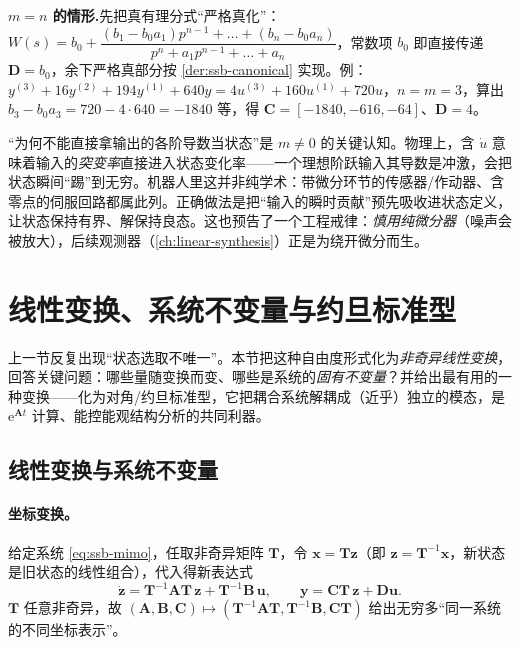 \begin{note}
\textbf{$m=n$ 的情形.}\;先把真有理分式“严格真化”：$W(s)=b_0+\dfrac{(b_1-b_0a_1)p^{n-1}+\dots+(b_n-b_0 a_n)}{p^n+a_1 p^{n-1}+\dots+a_n}$，常数项 $b_0$ 即直接传递 $\mathbf{D}=b_0$，余下严格真部分按 \cref{der:ssb-canonical} 实现。例：$y^{(3)}+16y^{(2)}+194y^{(1)}+640y=4u^{(3)}+160u^{(1)}+720u$，$n=m=3$，算出 $b_3-b_0a_3=720-4\cdot640=-1840$ 等，得 $\mathbf{C}=[-1840,-616,-64]$、$\mathbf{D}=4$\cite{zhang2017modern}。
\end{note}

\begin{insight}
“为何不能直接拿输出的各阶导数当状态”是 $m\neq0$ 的关键认知\cite{zhang2017modern}。物理上，含 $\dot u$ 意味着输入的\emph{突变率}直接进入状态变化率——一个理想阶跃输入其导数是冲激，会把状态瞬间“踢”到无穷。机器人里这并非纯学术：带微分环节的传感器/作动器、含零点的伺服回路都属此列。正确做法是把“输入的瞬时贡献”预先吸收进状态定义，让状态保持有界、解保持良态。这也预告了一个工程戒律：\emph{慎用纯微分器}（噪声会被放大），后续观测器（\cref{ch:linear-synthesis}）正是为绕开微分而生。
\end{insight}

\section{线性变换、系统不变量与约旦标准型}
\label{sec:ssb-transform}

上一节反复出现“状态选取不唯一”。本节把这种自由度形式化为\emph{非奇异线性变换}，回答关键问题：哪些量随变换而变、哪些是系统的\emph{固有不变量}？并给出最有用的一种变换——化为对角/约旦标准型，它把耦合系统解耦成（近乎）独立的模态，是 $\mathrm{e}^{\mathbf{A}t}$ 计算、能控能观结构分析的共同利器。

\subsection{线性变换与系统不变量}
\label{sec:ssb-invariant}

\paragraph{坐标变换。}
给定系统 \cref{eq:ssb-mimo}，任取非奇异矩阵 $\mathbf{T}$，令 $\mathbf{x}=\mathbf{T}\mathbf{z}$（即 $\mathbf{z}=\mathbf{T}^{-1}\mathbf{x}$，新状态是旧状态的线性组合），代入得新表达式
\begin{equation}
  \dot{\mathbf{z}}=\mathbf{T}^{-1}\mathbf{A}\mathbf{T}\,\mathbf{z}+\mathbf{T}^{-1}\mathbf{B}\,\mathbf{u},\qquad \mathbf{y}=\mathbf{C}\mathbf{T}\,\mathbf{z}+\mathbf{D}\mathbf{u}.
  \label{eq:ssb-similarity}
\end{equation}
$\mathbf{T}$ 任意非奇异，故 $(\mathbf{A},\mathbf{B},\mathbf{C})\mapsto(\mathbf{T}^{-1}\mathbf{A}\mathbf{T},\mathbf{T}^{-1}\mathbf{B},\mathbf{C}\mathbf{T})$ 给出无穷多“同一系统的不同坐标表示”。

